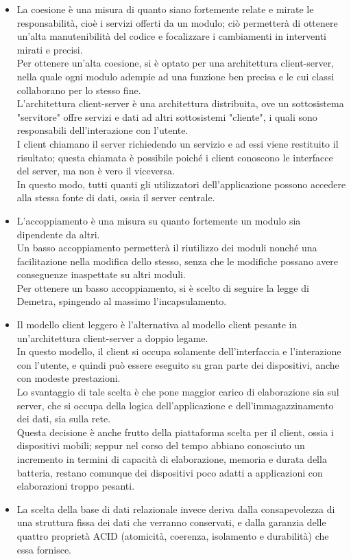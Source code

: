         \begin{itemize}
            \item La coesione è una misura di quanto siano fortemente relate e mirate le responsabilità, cioè i servizi offerti da un modulo; ciò permetterà di ottenere un’alta manutenibilità del codice e focalizzare i cambiamenti in interventi mirati e precisi. \\
            Per ottenere un'alta coesione, si è optato per una architettura client-server, nella quale ogni modulo adempie ad una funzione ben precisa e le cui classi collaborano per lo stesso fine. \\
            L'architettura client-server è una architettura distribuita, ove un sottosistema "servitore" offre servizi e dati ad altri sottosistemi "cliente", i quali sono responsabili dell'interazione con l'utente. \\
            I client chiamano il server richiedendo un servizio e ad essi viene restituito il risultato; questa chiamata è possibile poiché i client conoscono le interfacce del server, ma non è vero il viceversa. \\
            In questo modo, tutti quanti gli utilizzatori dell'applicazione possono accedere alla stessa fonte di dati, ossia il server centrale.
            \item L’accoppiamento è una misura su quanto fortemente un modulo sia dipendente da altri. \\
            Un basso accoppiamento permetterà il riutilizzo dei moduli nonché una facilitazione nella modifica dello stesso, senza che le modifiche possano avere conseguenze inaspettate su altri moduli. \\
            Per ottenere un basso accoppiamento, si è scelto di seguire la legge di Demetra, spingendo al massimo l'incapsulamento.
            \item Il modello client leggero è l'alternativa al modello client pesante in un'architettura client-server a doppio legame. \\
            In questo modello, il client si occupa solamente dell'interfaccia e l'interazione con l'utente, e quindi può essere eseguito su gran parte dei dispositivi, anche con modeste prestazioni. \\
            Lo svantaggio di tale scelta è che pone maggior carico di elaborazione sia sul server, che si occupa della logica dell'applicazione e dell'immagazzinamento dei dati, sia sulla rete. \\
            Questa decisione è anche frutto della piattaforma scelta per il client, ossia i dispositivi mobili; seppur nel corso del tempo abbiano conosciuto un incremento in termini di capacità di elaborazione, memoria e durata della batteria, restano comunque dei dispositivi poco adatti a applicazioni con elaborazioni troppo pesanti.
            \item La scelta della base di dati relazionale invece deriva dalla consapevolezza di una struttura fissa dei dati che verranno conservati, e dalla garanzia delle quattro proprietà ACID (atomicità, coerenza, isolamento e durabilità) che essa fornisce.
        \end{itemize}

